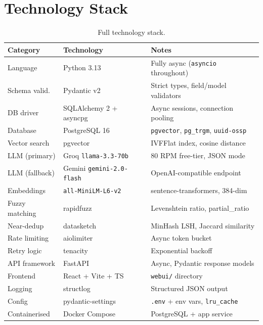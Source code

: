 \documentclass[11pt,a4paper]{article}
\newcommand{\code}[1]{\texttt{\small#1}}
\begin{document}
\section{Technology Stack}

\begin{table}[H]
\centering\small
\begin{tabularx}{\linewidth}{L{3.0cm} L{3.8cm} X}
\toprule
{}
\color{white}\textbf{Category} & \color{white}\textbf{Technology} & \color{white}\textbf{Notes} \\
\midrule
Language        & Python 3.13          & Fully async (\code{asyncio} throughout) \\
Schema valid.   & Pydantic v2          & Strict types, field/model validators \\
DB driver       & SQLAlchemy 2 + asyncpg & Async sessions, connection pooling \\
Database        & PostgreSQL 16        & \code{pgvector}, \code{pg\_trgm}, \code{uuid-ossp} \\
Vector search   & pgvector             & IVFFlat index, cosine distance \\
LLM (primary)   & Groq \code{llama-3.3-70b} & 80 RPM free-tier, JSON mode \\
LLM (fallback)  & Gemini \code{gemini-2.0-flash} & OpenAI-compatible endpoint \\
Embeddings      & \code{all-MiniLM-L6-v2} & sentence-transformers, 384-dim \\
Fuzzy matching  & rapidfuzz            & Levenshtein ratio, partial\_ratio \\
Near-dedup      & datasketch           & MinHash LSH, Jaccard similarity \\
Rate limiting   & aiolimiter           & Async token bucket \\
Retry logic     & tenacity             & Exponential backoff \\
API framework   & FastAPI              & Async, Pydantic response models \\
Frontend        & React + Vite + TS    & \code{webui/} directory \\
Logging         & structlog            & Structured JSON output \\
Config          & pydantic-settings    & \code{.env} + env vars, \code{lru\_cache} \\
Containerised   & Docker Compose       & PostgreSQL + app service \\
\bottomrule
\end{tabularx}
\caption{Full technology stack.}
\end{table}
\end{document}
